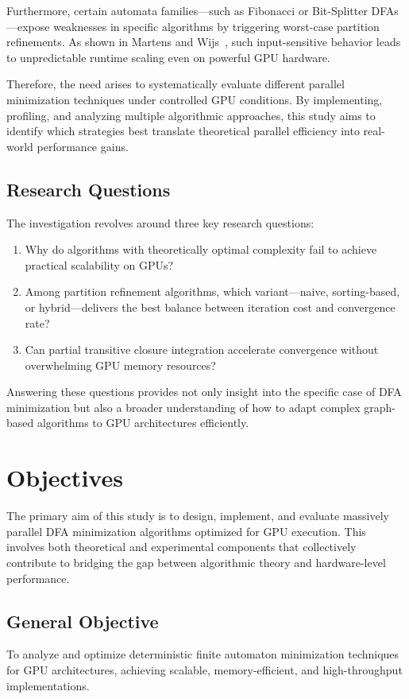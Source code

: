 Furthermore, certain automata families—such as Fibonacci or Bit-Splitter DFAs—expose weaknesses in specific algorithms by triggering worst-case partition refinements. As shown in Martens and Wijs~\cite{martenswijs2024}, such input-sensitive behavior leads to unpredictable runtime scaling even on powerful GPU hardware.

Therefore, the need arises to systematically evaluate different parallel minimization techniques under controlled GPU conditions. By implementing, profiling, and analyzing multiple algorithmic approaches, this study aims to identify which strategies best translate theoretical parallel efficiency into real-world performance gains.

\subsection{Research Questions}

The investigation revolves around three key research questions:
\begin{enumerate}
    \item Why do algorithms with theoretically optimal complexity fail to achieve practical scalability on GPUs?
    \item Among partition refinement algorithms, which variant—naive, sorting-based, or hybrid—delivers the best balance between iteration cost and convergence rate?
    \item Can partial transitive closure integration accelerate convergence without overwhelming GPU memory resources?
\end{enumerate}

Answering these questions provides not only insight into the specific case of DFA minimization but also a broader understanding of how to adapt complex graph-based algorithms to GPU architectures efficiently.

\section{Objectives}

The primary aim of this study is to design, implement, and evaluate massively parallel DFA minimization algorithms optimized for GPU execution. This involves both theoretical and experimental components that collectively contribute to bridging the gap between algorithmic theory and hardware-level performance.

\subsection{General Objective}
To analyze and optimize deterministic finite automaton minimization techniques for GPU architectures, achieving scalable, memory-efficient, and high-throughput implementations.

